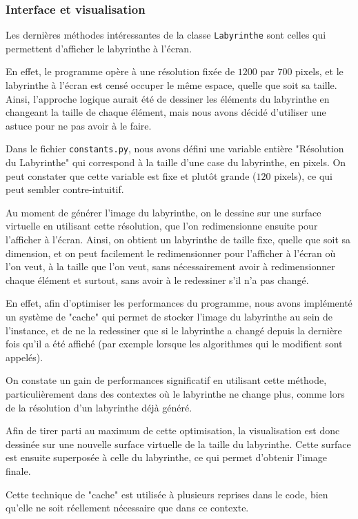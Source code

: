 \documentclass[12pt]{scrreprt} %
\begin{document}
\subsubsection{Interface et visualisation}

Les dernières méthodes intéressantes de la classe \texttt{Labyrinthe} sont celles qui permettent d'afficher le labyrinthe à l'écran.

En effet, le programme opère à une résolution fixée de $1200$ par $700$ pixels, et le labyrinthe à l'écran est censé occuper le même espace, quelle que soit sa taille. Ainsi, l'approche logique aurait été de dessiner les éléments du labyrinthe en changeant la taille de chaque élément, mais nous avons décidé d'utiliser une astuce pour ne pas avoir à le faire.

Dans le fichier \texttt{constants.py}, nous avons défini une variable entière "Résolution du Labyrinthe" qui correspond à la taille d'une case du labyrinthe, en pixels. On peut constater que cette variable est fixe et plutôt grande ($120$ pixels), ce qui peut sembler contre-intuitif.

Au moment de générer l'image du labyrinthe, on le dessine sur une surface virtuelle en utilisant cette résolution, que l'on redimensionne ensuite pour l'afficher à l'écran. Ainsi, on obtient un labyrinthe de taille fixe, quelle que soit sa dimension, et on peut facilement le redimensionner pour l'afficher à l'écran où l'on veut, à la taille que l'on veut, sans nécessairement avoir à redimensionner chaque élément et surtout, sans avoir à le redessiner s'il n'a pas changé.

En effet, afin d'optimiser les performances du programme, nous avons implémenté un système de "cache" qui permet de stocker l'image du labyrinthe au sein de l'instance, et de ne la redessiner que si le labyrinthe a changé depuis la dernière fois qu'il a été affiché (par exemple lorsque les algorithmes qui le modifient sont appelés).

On constate un gain de performances significatif en utilisant cette méthode, particulièrement dans des contextes où le labyrinthe ne change plus, comme lors de la résolution d'un labyrinthe déjà généré.

Afin de tirer parti au maximum de cette optimisation, la visualisation est donc dessinée sur une nouvelle surface virtuelle de la taille du labyrinthe. Cette surface est ensuite superposée à celle du labyrinthe, ce qui permet d'obtenir l'image finale.

Cette technique de "cache" est utilisée à plusieurs reprises dans le code, bien qu'elle ne soit réellement nécessaire que dans ce contexte.
\end{document}
